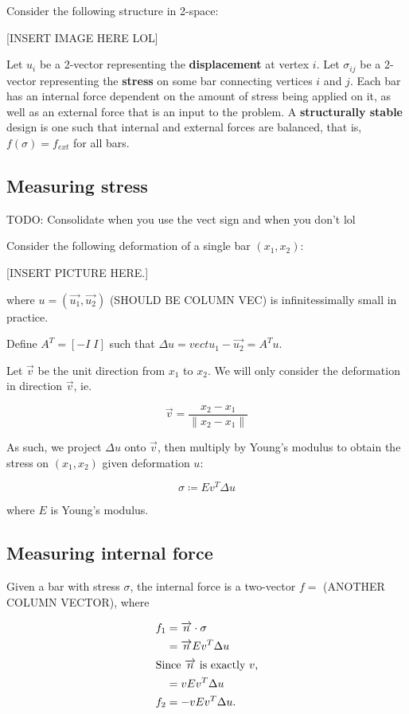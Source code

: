 \documentclass[11pt]{article}
\theoremstyle{definition}
\newcommand{\vect}[1]{\overrightarrow{#1}}
\newcommand{\defeq}{\coloneqq}
\begin{document}
Consider the following structure in 2-space:

[INSERT IMAGE HERE LOL]

Let $u_i$ be a 2-vector representing the \textbf{displacement} at vertex $i$.
Let $\sigma_{ij}$ be a 2-vector representing the \textbf{stress} on some bar connecting
vertices $i$ and $j$. Each bar has an internal force dependent on the amount of
stress being applied on it, as well as an external force that is an input to the
problem. A \textbf{structurally stable} design is one such that internal and
external forces are balanced, that is, $f(\sigma) = f_{ext}$ for all bars.

\subsection{Measuring stress}
TODO: Consolidate when you use the vect sign and when you don't lol

Consider the following deformation of a single bar $(x_1, x_2)$:

[INSERT PICTURE HERE.]

where $u = (\vect{u_1}, \vect{u_2})$ (SHOULD BE COLUMN VEC) is infinitessimally
small in practice.

Define $A^T = [-I \; I]$ such that $\Delta u = vect{u_1} - \vect{u_2} = A^T u$.

Let $\vect{v}$ be the unit direction from $x_1$ to $x_2$. We will only consider
the deformation in direction $\vect{v}$, ie.

\[ \vect{v} = \frac{x_2 - x_1}{\lVert x_2 - x_1 \rVert} \]

As such, we project $\Delta u$ onto $\vect{v}$, then multiply by Young's
modulus to obtain the stress on $(x_1, x_2)$ given deformation $u$:

\begin{equation}
  \sigma \defeq E v^T \Delta u
\end{equation}

where $E$ is Young's modulus.

\subsection{Measuring internal force}
Given a bar with stress $\sigma$, the internal force is a two-vector $f = $
(ANOTHER COLUMN VECTOR), where

\begin{align*}
  f_1 &= \vect{n} \cdot \sigma \\
      &= \vect{n} E v^T \Delta u \\
      \intertext{Since $\vect{n}$ is exactly $v$,}
      &= v E v^T \Delta u \\
  f_2 &= - v E v^T \Delta u.
\end{align*}
\end{document}
